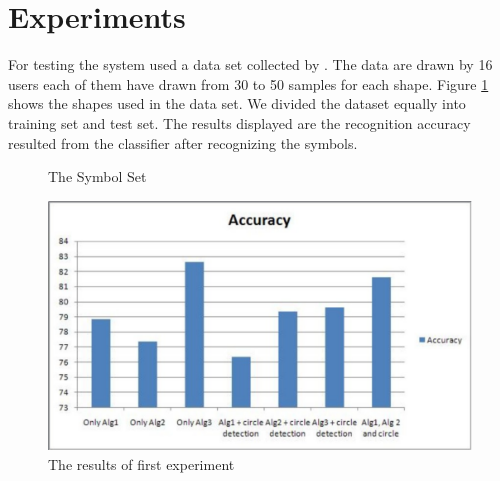 \documentclass[a4paper,10pt]{IEEEconf}
\begin{document}
\section{Experiments}\label{sec:Experiments}
For testing the system used a data set collected by \citeauthor{HeloiseBeautification}. The data are drawn by 16 users each of them have drawn from 30 to 50 samples for each shape. Figure \ref{fig:symbolSet} shows the shapes used in the data set. We divided the dataset equally into training set and test set.  The results displayed are the recognition accuracy resulted from the classifier after recognizing the symbols. \\
\begin{figure}[]\centering
{}
	\caption{The Symbol Set}
	\label{fig:symbolSet}
\end{figure}
\begin{figure}[]
	\centering
		\includegraphics[scale=0.3]{images/test1.pdf}
	\caption{The results of first experiment}
	\label{fig:test1}
\end{figure}
\end{document}

